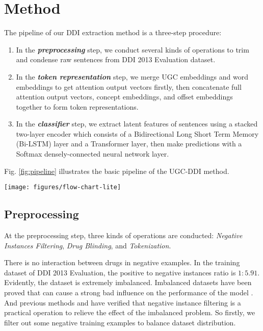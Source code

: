 \documentclass[conference]{IEEEtran}
\begin{document}
\section{Method}
\label{sec:method}

The pipeline of our DDI extraction method is a three-step procedure:

\begin{enumerate}
	\item In the \emph{\textbf{preprocessing}} step, we conduct several kinds of operations to trim and condense raw sentences from DDI 2013 Evaluation dataset.
	\item In the \emph{\textbf{token representation}} step, we merge UGC embeddings and word embeddings to get attention output vectors
	firstly, then concatenate full attention output vectors, concept embeddings, and offset embeddings together to form token representations.
	\item In the \emph{\textbf{classifier}} step, we extract latent features of sentences using a stacked
	two-layer encoder which consists of a Bidirectional Long Short Term Memory (Bi-LSTM) layer and a Transformer layer,
	then make predictions with a Softmax densely-connected neural network layer.
\end{enumerate}

Fig. \ref{fig:pipeline} illustrates the basic pipeline of the UGC-DDI method.

\begin{figure*}[ht]
	\centering
	\texttt{[image: figures/flow-chart-lite]}
	\caption{The Pipeline of UGC-DDI method.}
	\label{fig:pipeline}
\end{figure*}

\subsection{Preprocessing}

At the preprocessing step, three kinds of operations are conducted: \emph{Negative Instances Filtering}, 
\emph{Drug Blinding}, and \emph{Tokenization}.

There is no interaction between drugs in negative examples.
In the training dataset of DDI 2013 Evaluation, the positive to negative instances ratio is $1 \colon 5.91$.
Evidently, the dataset is extremely imbalanced.
Imbalanced datasets have been proved that can cause a strong bad influence on the performance of the model \cite{lopez_insight_2013}.
And previous methods \cite{zhao_drug_2016} and \cite{sahu_drug-drug_2017} have verified that negative instance filtering
is a practical operation to relieve the effect of the imbalanced problem.
So firstly, we filter out some negative training examples to balance dataset distribution.
\end{document}
